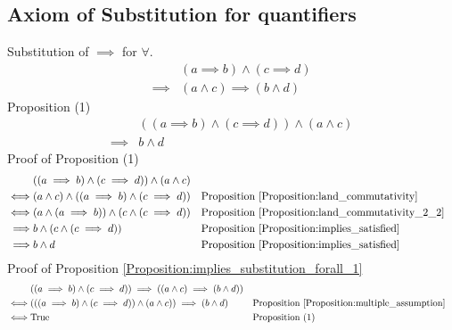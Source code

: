 \subsection{Axiom of Substitution for quantifiers}
\begin{prop}
\label{Proposition:implies_substitution_forall_1}
Substitution of $\implies$ for $\forall$.
\begin{align*}
& (a \implies b) \land (c \implies d) \\
\implies & (a \land c) \implies (b \land d)
\end{align*}
Proposition (1)
\begin{align*}
& ((a \implies b) \land (c \implies d)) \land (a \land c) \\
\implies & b \land d
\end{align*}
Proof of Proposition (1)
\begin{align*}
& ((a \implies b) \land (c \implies d)) \land (a \land c) \\
\iff & (a \land c) \land ((a \implies b) \land (c \implies d))
& & \text{Proposition \ref{Proposition:land_commutativity}} \\
\iff & (a \land (a \implies b)) \land (c \land (c \implies d))
& & \text{Proposition \ref{Proposition:land_commutativity_2_2}} \\
\implies & b \land (c \land (c \implies d))
& & \text{Proposition \ref{Proposition:implies_satisfied}} \\
\implies & b \land d
& & \text{Proposition \ref{Proposition:implies_satisfied}} \\
\end{align*}
Proof of Proposition \ref{Proposition:implies_substitution_forall_1}
\begin{align*}
& ((a \implies b) \land (c \implies d)) \implies ((a \land c) \implies (b \land d)) \\
\iff & (((a \implies b) \land (c \implies d)) \land (a \land c)) \implies (b \land d)
& & \text{Proposition \ref{Proposition:multiple_assumption}} \\
\iff & \text{True}
& & \text{Proposition (1)} \\
\end{align*}
\end{prop}

